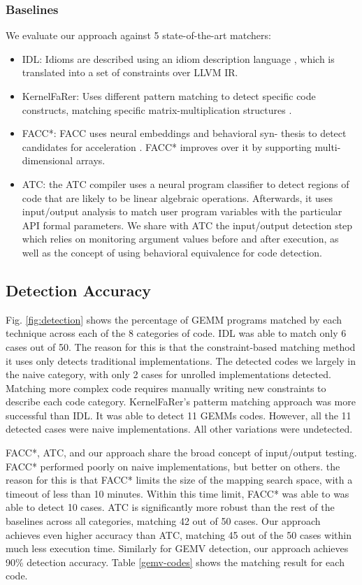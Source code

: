 \documentclass[manuscript,screen,review]{acmart}
\begin{document}
\subsubsection{Baselines}
We evaluate our approach against 5 state-of-the-art matchers:
\begin{itemize}
	\item IDL: Idioms are described using an idiom description language \cite{IDL}, which is translated into a set of constraints over LLVM IR.
	\item KernelFaRer: Uses different pattern matching to detect specific code constructs, matching specific matrix-multiplication structures \cite{kernelfarer}.
	\item FACC*: FACC uses neural embeddings and behavioral syn-
	thesis to detect candidates for acceleration \cite{facc}. FACC* improves over it by
	supporting multi-dimensional arrays.
	\item ATC: the ATC compiler uses a neural program classifier to detect regions of code that are likely to be linear algebraic operations. Afterwards, it uses input/output analysis to match user program variables with the particular API formal parameters. We share with ATC the input/output detection step which relies on monitoring argument values before and after execution, as well as the concept of using behavioral equivalence for code detection.
\end{itemize}


\subsection{Detection Accuracy}

Fig. \ref{fig:detection} shows the percentage of GEMM programs matched
by each technique across each of the 8 categories of code.
IDL was able to match only 6 cases out of 50. The reason for this is that the constraint-based matching method it uses only detects traditional implementations. The detected codes we largely in the naive category, with only 2 cases for unrolled implementations detected. Matching more complex code requires manually writing new constraints to describe each code category. KernelFaRer's patterm matching approach was more successful than IDL. It was able to detect 11 GEMMs codes. However, all the 11 detected cases were naive implementations. All other variations were undetected.

FACC*, ATC, and our approach share the broad concept of input/output testing. FACC* performed poorly on naive implementations, but better on others. the reason for this is that FACC* limits the size of the mapping search space, with a timeout of less than 10 minutes. Within this time limit, FACC* was able to 
was able to detect 10 cases. ATC is significantly more robust than the rest of the baselines across all categories, matching 42 out of 50 cases. Our approach achieves even higher accuracy than ATC, matching 45 out of the 50 cases within much less execution time. Similarly for GEMV detection, our approach achieves
90\% detection accuracy. Table \ref{gemv-codes} shows the matching result for each code.
\end{document}
